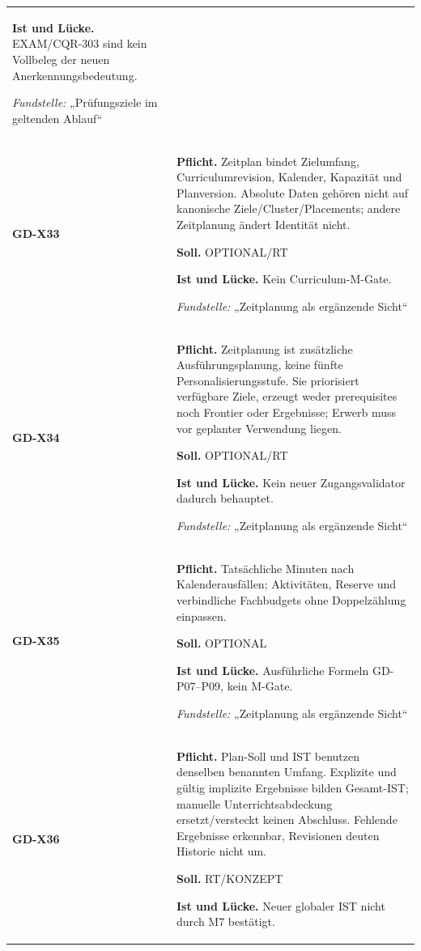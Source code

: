 \begin{longtable}{@{}P{20mm}P{128mm}@{}}
\textbf{Ist und Lücke.} EXAM/CQR-303 sind kein Vollbeleg der neuen Anerkennungsbedeutung.\par\smallskip
\emph{Fundstelle:} „Prüfungsziele im geltenden Ablauf“\\\addlinespace[5pt]
\label{rule:GD-X33}\textbf{GD-X33} &
\textbf{Pflicht.} Zeitplan bindet Zielumfang, Curriculumrevision, Kalender, Kapazität und Planversion. Absolute Daten gehören nicht auf kanonische Ziele/Cluster/Placements; andere Zeitplanung ändert Identität nicht.\par\smallskip
\textbf{Soll.} OPTIONAL/RT\par\smallskip
\textbf{Ist und Lücke.} Kein Curriculum-M-Gate.\par\smallskip
\emph{Fundstelle:} „Zeitplanung als ergänzende Sicht“\\\addlinespace[5pt]
\label{rule:GD-X34}\textbf{GD-X34} &
\textbf{Pflicht.} Zeitplanung ist zusätzliche Ausführungsplanung, keine fünfte Personalisierungsstufe. Sie priorisiert verfügbare Ziele, erzeugt weder prerequisites noch Frontier oder Ergebnisse; Erwerb muss vor geplanter Verwendung liegen.\par\smallskip
\textbf{Soll.} OPTIONAL/RT\par\smallskip
\textbf{Ist und Lücke.} Kein neuer Zugangsvalidator dadurch behauptet.\par\smallskip
\emph{Fundstelle:} „Zeitplanung als ergänzende Sicht“\\\addlinespace[5pt]
\label{rule:GD-X35}\textbf{GD-X35} &
\textbf{Pflicht.} Tatsächliche Minuten nach Kalenderausfällen; Aktivitäten, Reserve und verbindliche Fachbudgets ohne Doppelzählung einpassen.\par\smallskip
\textbf{Soll.} OPTIONAL\par\smallskip
\textbf{Ist und Lücke.} Ausführliche Formeln GD-P07–P09, kein M-Gate.\par\smallskip
\emph{Fundstelle:} „Zeitplanung als ergänzende Sicht“\\\addlinespace[5pt]
\label{rule:GD-X36}\textbf{GD-X36} &
\textbf{Pflicht.} Plan-Soll und IST benutzen denselben benannten Umfang. Explizite und gültig implizite Ergebnisse bilden Gesamt-IST; manuelle Unterrichtsabdeckung ersetzt/versteckt keinen Abschluss. Fehlende Ergebnisse erkennbar, Revisionen deuten Historie nicht um.\par\smallskip
\textbf{Soll.} RT/KONZEPT\par\smallskip
\textbf{Ist und Lücke.} Neuer globaler IST nicht durch M7 bestätigt.\par\smallskip

\end{longtable}
